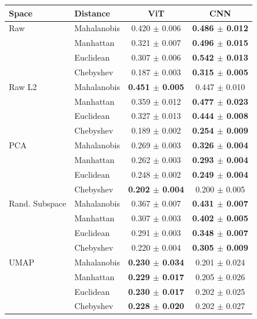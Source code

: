 \begin{tabular}{llcc}
\toprule
Space & Distance & ViT & CNN \\
\midrule
Raw & Mahalanobis & 0.420 $\pm$ 0.006 & \textbf{0.486 $\pm$ 0.012} \\
 & Manhattan & 0.321 $\pm$ 0.007 & \textbf{0.496 $\pm$ 0.015} \\
 & Euclidean & 0.307 $\pm$ 0.006 & \textbf{0.542 $\pm$ 0.013} \\
 & Chebyshev & 0.187 $\pm$ 0.003 & \textbf{0.315 $\pm$ 0.005} \\
\midrule
Raw L2 & Mahalanobis & \textbf{0.451 $\pm$ 0.005} & 0.447 $\pm$ 0.010 \\
 & Manhattan & 0.359 $\pm$ 0.012 & \textbf{0.477 $\pm$ 0.023} \\
 & Euclidean & 0.327 $\pm$ 0.013 & \textbf{0.444 $\pm$ 0.008} \\
 & Chebyshev & 0.189 $\pm$ 0.002 & \textbf{0.254 $\pm$ 0.009} \\
\midrule
PCA & Mahalanobis & 0.269 $\pm$ 0.003 & \textbf{0.326 $\pm$ 0.004} \\
 & Manhattan & 0.262 $\pm$ 0.003 & \textbf{0.293 $\pm$ 0.004} \\
 & Euclidean & 0.248 $\pm$ 0.002 & \textbf{0.249 $\pm$ 0.004} \\
 & Chebyshev & \textbf{0.202 $\pm$ 0.004} & 0.200 $\pm$ 0.005 \\
\midrule
Rand. Subspace & Mahalanobis & 0.367 $\pm$ 0.007 & \textbf{0.431 $\pm$ 0.007} \\
 & Manhattan & 0.307 $\pm$ 0.003 & \textbf{0.402 $\pm$ 0.005} \\
 & Euclidean & 0.291 $\pm$ 0.003 & \textbf{0.348 $\pm$ 0.007} \\
 & Chebyshev & 0.220 $\pm$ 0.004 & \textbf{0.305 $\pm$ 0.009} \\
\midrule
UMAP & Mahalanobis & \textbf{0.230 $\pm$ 0.034} & 0.201 $\pm$ 0.024 \\
 & Manhattan & \textbf{0.229 $\pm$ 0.017} & 0.205 $\pm$ 0.026 \\
 & Euclidean & \textbf{0.230 $\pm$ 0.017} & 0.202 $\pm$ 0.025 \\
 & Chebyshev & \textbf{0.228 $\pm$ 0.020} & 0.202 $\pm$ 0.027 \\

\bottomrule
\end{tabular}